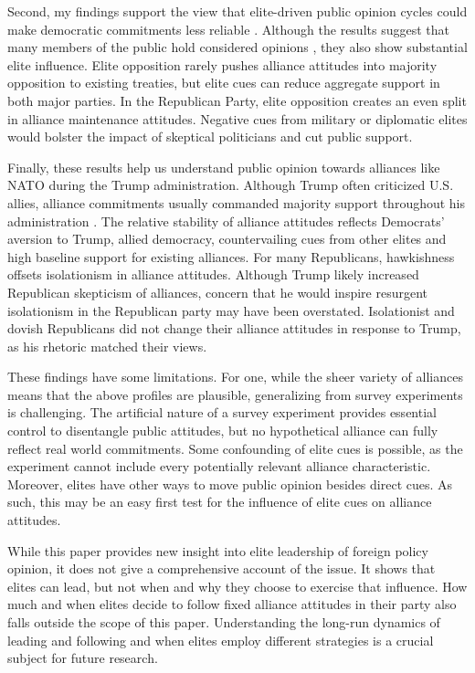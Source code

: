 \documentclass[12pt]{article}
\begin{document}
Second, my findings support the view that elite-driven public opinion cycles could make democratic commitments less reliable \citep{GartzkeGleditsch2004}. 
Although the results suggest that many members of the public hold considered opinions \citep{PageShapiro1992}, they also show substantial elite influence. 
Elite opposition rarely pushes alliance attitudes into majority opposition to existing treaties, but elite cues can reduce aggregate support in both major parties.
In the Republican Party, elite opposition creates an even split in alliance maintenance attitudes. 
Negative cues from military or diplomatic elites would bolster the impact of skeptical politicians and cut public support. 


Finally, these results help us understand public opinion towards alliances like NATO during the Trump administration.
Although Trump often criticized U.S. allies, alliance commitments usually commanded majority support throughout his administration \citep{PewNATO2020}. 
The relative stability of alliance attitudes reflects Democrats' aversion to Trump, allied democracy, countervailing cues from other elites and high baseline support for existing alliances. 
For many Republicans, hawkishness offsets isolationism in alliance attitudes.
Although Trump likely increased Republican skepticism of alliances, concern that he would inspire resurgent isolationism in the Republican party may have been overstated.
Isolationist and dovish Republicans did not change their alliance attitudes in response to Trump, as his rhetoric matched their views. 


These findings have some limitations. 
For one, while the sheer variety of alliances means that the above profiles are plausible, generalizing from survey experiments is challenging. 
The artificial nature of a survey experiment provides essential control to disentangle public attitudes, but no hypothetical alliance can fully reflect real world commitments.
Some confounding of elite cues is possible, as the experiment cannot include every potentially relevant alliance characteristic. 
Moreover, elites have other ways to move public opinion besides direct cues.
As such, this may be an easy first test for the influence of elite cues on alliance attitudes. 


While this paper provides new insight into elite leadership of foreign policy opinion, it does not give a comprehensive account of the issue.
It shows that elites can lead, but not when and why they choose to exercise that influence. 
How much and when elites decide to follow fixed alliance attitudes in their party also falls outside the scope of this paper. 
Understanding the long-run dynamics of leading and following and when elites employ different strategies is a crucial subject for future research. 
\end{document}
